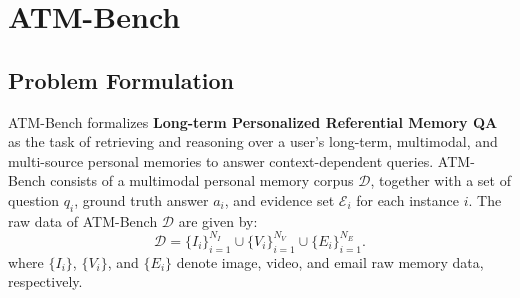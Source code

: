 \documentclass{article}
\theoremstyle{plain}
\theoremstyle{definition}
\theoremstyle{remark}
\begin{document}
\section{ATM-Bench}
\label{sec:dataset}
\subsection{Problem Formulation}
 ATM-Bench formalizes \textbf{Long-term Personalized Referential Memory QA} as the task of retrieving and reasoning over a user’s long-term, multimodal, and multi-source personal memories to answer context-dependent queries. ATM-Bench consists of a multimodal personal memory corpus $\mathcal{D}$, together with a set of question $q_i$, ground truth answer $a_i$, and evidence set $\mathcal{E}_i$ for each instance $i$. The raw data of ATM-Bench $\mathcal{D}$ are given by:
 \begin{equation}
     \mathcal{D}
= \{I_i\}_{i=1}^{N_I}\cup\{V_i\}_{i=1}^{N_V}\cup\{E_i\}_{i=1}^{N_E}.
\label{eq:rawData}
 \end{equation}
where $\{I_i\}$, $\{V_i\}$, and $\{E_i\}$ denote image, video, and email raw memory data, respectively.

\end{document}
